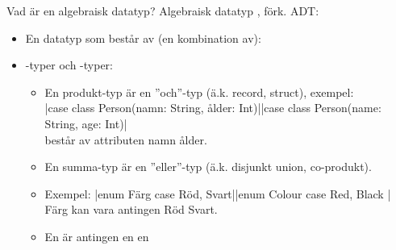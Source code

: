 
\begin{Slide}{Vad är en algebraisk datatyp?}%
Algebraisk datatyp , förk. ADT:
\begin{itemize}%
\item En datatyp som består av (en kombination av): 
\item {}-typer och -typer:
\begin{itemize}%
\item En produkt-typ är en ''och''-typ (ä.k. record, struct), exempel: \\ \ifswedish\code|case class Person(namn: String, ålder: Int)|\else\code|case class Person(name: String, age: Int)|\fi{} \\består av attributen namn  ålder.
\item En summa-typ  är en ''eller''-typ (ä.k. disjunkt union, co-produkt).
\item Exempel: \ifswedish\code|enum Färg { case Röd, Svart}|\else\code|enum Colour { case Red, Black }|\fi{} \\Färg kan vara antingen Röd  Svart.
\item[] En \ifswedish{}\else{}\fi{} är antingen en \ifswedish{}\else{}\fi{}  en \ifswedish{}\else{}\fi{}

\end{itemize}
\end{itemize}
\end{Slide}
